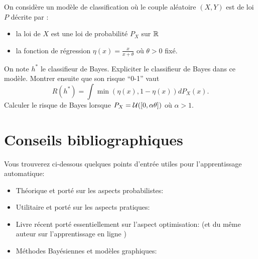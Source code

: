 \documentclass[a4paper,11pt]{article}
\begin{document}
\sloppy
{}

\medskip


\exercice  On considère un modèle de classification où le couple aléatoire $(X, Y)$ est de loi $P$ décrite par :
\begin{itemize}
\item la loi de $X$ est une loi de probabilité $P_X$ sur $\mathbb{R}$
\item la fonction de régression $\displaystyle \eta(x) = \frac{x}{x+\theta}$ où $\theta>0$ fixé.
\end{itemize}
On note $h^*$ le classifieur de Bayes. Expliciter le classifieur de Bayes dans ce modèle. Montrer ensuite que son risque ``0-1'' vaut
\begin{equation*}
	R(h^*)=\int \min(\eta(x),1-\eta(x)) dP_X(x).
\end{equation*}
 Calculer le risque de Bayes lorsque $P_X = \mathcal{U}([0, \alpha\theta])$ où $\alpha>1$.



\section*{Conseils bibliographiques}
\label{sec:bibliographie}


Vous trouverez ci-dessous quelques points d’entrée utiles pour l'apprentissage automatique:

\begin{itemize}
	\item Théorique et porté sur les aspects probabilistes: \cite{Devroye_Gyorfi_Lugosi96}
	\item Utilitaire et porté sur les aspects pratiques: \cite{Hastie_Tibshirani_Friedman09}
	\item Livre récent porté essentiellement sur l’aspect optimisation: \cite{Shalev-Shwartz_Ben-David14} (et du même auteur sur l'apprentissage en ligne \cite{Shalev-Shwartz11})
	\item Méthodes Bayésiennes et modèles graphiques: \cite{Murphy12}
\end{itemize}



\printbibliography
\end{document}
